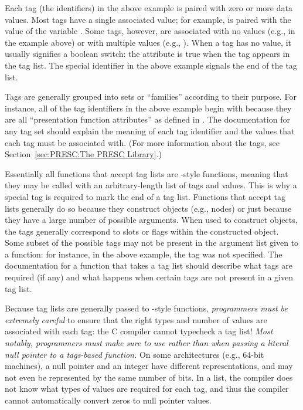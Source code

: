 \noindent Each tag (the  identifiers) in the above example
is paired with zero or more data values.  Most tags have a single associated
value; for example,  is paired with the value of
the variable .  Some tags, however, are
associated with no values (e.g.,  in the example
above) or with multiple values (e.g., ).  When a tag
has no value, it usually signifies a boolean switch: the attribute is true when
the tag appears in the tag list.  The special 
identifier in the above example signals the end of the tag list.

Tags are generally grouped into sets or ``families'' according to their
purpose.  For instance, all of the tag identifiers in the above example begin
with  because they are all ``presentation function
attributes'' as defined in .  The documentation for
any tag set should explain the meaning of each tag identifier and the values
that each tag must be associated with.  (For more information about the
 tags, see Section~\ref{sec:PRESC:The PRESC Library}.)

Essentially all functions that accept tag lists are -style
functions, meaning that they may be called with an arbitrary-length list of
tags and values.  This is why a special tag is required to mark the end of a
tag list.  Functions that accept tag lists generally do so because they
construct objects (e.g., \PRESC{} nodes) or just because they have a large
number of possible arguments.  When used to construct objects, the tags
generally correspond to slots or flags within the constructed object.  Some
subset of the possible tags may not be present in the argument list given to a
function: for instance, in the above example, the
 tag was not specified.  The documentation for
a function that takes a tag list should describe what tags are required (if
any) and what happens when certain tags are not present in a given tag list.

Because tag lists are generally passed to -style
functions, \emph{programmers must be extremely careful} to ensure that the
right types and number of values are associated with each tag: the C compiler
cannot typecheck a tag list!  \emph{Most notably, programmers must make sure to
use  rather than  when passing a literal null
pointer to a tags-based function.}  On some architectures (e.g., 64-bit
machines), a null pointer and an integer  have different
representations, and may not even be represented by the same number of bits.
In a  list, the compiler does not know what types of
values are required for each tag, and thus the compiler cannot automatically
convert zeros to null pointer values.

